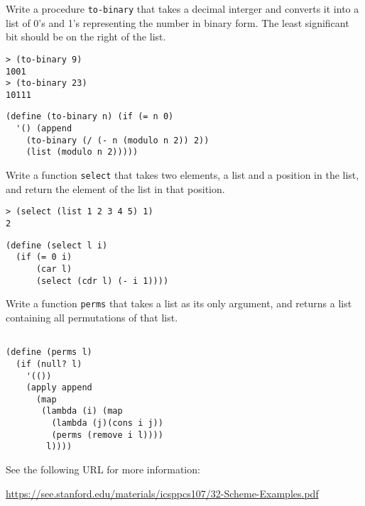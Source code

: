 \documentclass[a4paper, 12pt]{exam}
\begin{document}
\begin{questions}
\question
Write a procedure \texttt{to-binary} that takes a decimal interger and converts it into a list of 0's and 1's representing the number in binary form.
The least significant bit should be on the right of the list.
\begin{verbatim}
> (to-binary 9)
1001
> (to-binary 23)
10111
\end{verbatim}

\begin{solution}
  \begin{verbatim}
(define (to-binary n) (if (= n 0)
  '() (append
    (to-binary (/ (- n (modulo n 2)) 2))
    (list (modulo n 2)))))
  \end{verbatim}
\end{solution}

\question
Write a function \texttt{select} that takes two elements, a list and a position in the list, and return the element of the list in that position.
\begin{verbatim}
> (select (list 1 2 3 4 5) 1)
2
\end{verbatim}

\begin{solution}
  \begin{verbatim}
(define (select l i)
  (if (= 0 i)
      (car l)
      (select (cdr l) (- i 1))))
  \end{verbatim}
\end{solution}

\question
Write a function \texttt{perms} that takes a list as its only argument, and returns a list containing all permutations of that list.

\begin{solution}
\begin{verbatim}

(define (perms l)
  (if (null? l)
    '(())
    (apply append
      (map
       (lambda (i) (map
         (lambda (j)(cons i j))
         (perms (remove i l))))
        l))))
  \end{verbatim}

See the following URL for more information:

\url{https://see.stanford.edu/materials/icsppcs107/32-Scheme-Examples.pdf}
\end{solution}

\end{questions}



\end{document}
